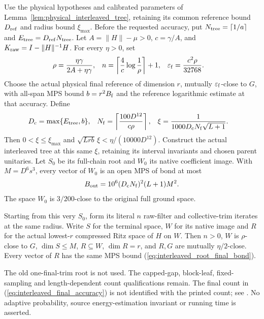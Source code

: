 \begin{lemma}
    \label{lem:physical_interleaved_tree_ritz}
    \leanok
    Use the physical hypotheses and calibrated parameters of
    Lemma~\ref{lem:physical_interleaved_tree}, retaining its common reference
    bound $D_{\rm ref}$ and radius bound $\xi_{\max}$.
    Before the requested accuracy, put
    $N_{\rm tree}=\lceil1/a\rceil$ and $E_{\rm tree}=D_{\rm ref}N_{\rm tree}$.
    Let $A=\|H\|-\mu>0$, $c=\gamma/A$, and
    $K_{\rm raw}=I-\|H\|^{-1}H$. For every $\eta>0$, set
    \begin{align}
        \rho                & =\frac{\eta\gamma}{2A+\eta\gamma},               &
        n                   & =\left\lceil\frac4c\log\frac1\rho\right\rceil+1, &
        \varepsilon_{\rm f} & =\frac{c^2\rho}{32768}.
        \label{eq:interleaved_final_accuracy}
    \end{align}
    Choose the actual physical final reference of dimension $r$, mutually
    $\varepsilon_{\rm f}$-close to $G$, with all-span MPS bound
    $b=r^2B_{\rm f}$ and the reference logarithmic estimate at that accuracy.
    Define
    \begin{align}
        D_{\rm c} & =\max\{E_{\rm tree},b\},                         &
        N_{\rm f} & =\left\lceil\frac{100D^{12}}{c\rho}\right\rceil, &
        \xi       & =\frac1{1000D_{\rm c}N_{\rm f}\sqrt{L+1}}.
        \label{eq:interleaved_final_common_radius}
    \end{align}
    Then $0<\xi\le\xi_{\max}$ and
    $\sqrt{Lrb}\,\xi<\eta/(10000D^{12})$.
    Construct the actual interleaved tree at this same $\xi$, retaining
    its interval invariants and chosen parent unitaries. Let $S_0$ be its
    full-chain root and $W_0$ its native coefficient image. With $M=D^6s^3$,
    every vector of $W_0$ is an open MPS of bond at most
    \begin{align}
        B_{\rm out}=10^6(D_{\rm c}N_{\rm f})^2(L+1)M^2.
        \label{eq:interleaved_root_final_bond}
    \end{align}
    The space $W_0$ is $3/200$-close to the original full ground space.

    Starting from this very $S_0$, form its literal $n$ raw-filter and
    collective-trim iterates at the same radius. Write $S$ for the terminal
    space, $W$ for its native image and $R$ for the actual lowest-$r$
    compressed Ritz space of $H$ on $W$. Then $n>0$, $W$ is $\rho$-close
    to $G$, $\dim S\le M$, $R\subseteq W$, $\dim R=r$, and $R,G$ are
    mutually $\eta/2$-close. Every vector of $R$ has the same MPS bound
    (\ref{eq:interleaved_root_final_bond}).

    The old one-final-trim root is not used. The capped-gap, block-leaf,
    fixed-sampling and length-dependent count qualifications remain.
    The final count in (\ref{eq:interleaved_final_accuracy}) is not identified
    with the printed count; see \cite{gap:alvv16_final_filter_gain}.
    No adaptive probability, source energy-estimation invariant or running
    time is asserted.
\end{lemma}
